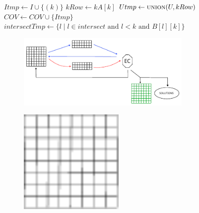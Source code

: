\documentclass{beamer}
\begin{document}
\begin{frame}{}
    \scriptsize
    \begin{algorithmic}
                \State $Itmp \gets I \cup \{(k)\}$
                \State $kRow \gets kA[k]$
                \State $Utmp \gets \Call{union}{U, kRow}$
                    \State $COV \gets COV \cup \{Itmp\}$
                \Else {}
                    \State $intersectTmp \gets \{l \mid l \in intersect \text{ and } l<k \text{ and } B[l][k]\}$
                        \State {}
                    \EndIf
                \EndIf
            \EndFor
        \EndFunction
    \end{algorithmic}
\end{frame}


\begin{frame}{}
    \begin{figure}
        \centering
        \includegraphics[width=0.75\textwidth]{partial_loading_mech.pdf}
        \label{fig:partial_loading_mech}
    \end{figure}
\end{frame}

\begin{frame}{}
    \begin{figure}
        \centering
        \includegraphics[width=0.45\textwidth]{grid_black.pdf}
        \label{fig:grid_black}
    \end{figure}
\end{frame}
\end{document}
